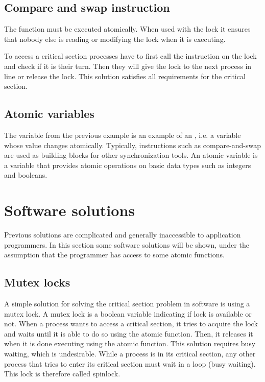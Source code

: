 \subsection{Compare and swap instruction}
The  function must be executed atomically. When used with the lock it ensures that nobody else is reading or modifying the lock when it is executing.

To access a critical section processes have to first call the  instruction on the lock and check if it is their turn. Then they will give the lock to the next process in line or release the lock. 
This solution satisfies all requirements for the critical section.

\subsection{Atomic variables}
The  variable from the previous example is an example of an , i.e. a variable whose value changes atomically. Typically, instructions such as compare-and-swap are used as building blocks for other synchronization tools. An atomic variable is a variable that provides atomic operations on basic data types such as integers and booleans.

\section{Software solutions}
Previous solutions are complicated and generally inaccessible to application programmers. In this section some software solutions will be shown, under the assumption that the programmer has access to some atomic functions.

\subsection{Mutex locks}
A simple solution for solving the critical section problem in software is using a mutex lock. A mutex lock is a boolean variable indicating if lock is available or not. When a process wants to access a critical section, it tries to acquire the lock and waits until it is able to do so using the  atomic function. Then, it releases it when it is done executing using the  atomic function. This solution requires busy waiting, which is undesirable. While a process is in its critical section, any other process that tries to enter its critical section must wait in a loop (busy waiting). This lock is therefore called spinlock.

